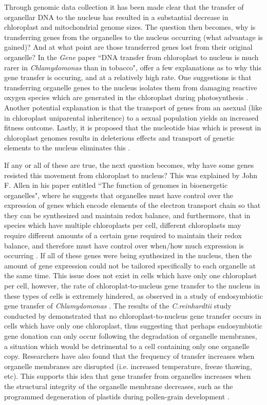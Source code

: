 \documentclass[a4paper,12pt]{article}
\begin{document}
\begin{multicols}{2}
Through genomic data collection it has been made clear that the
transfer of organellar DNA to the nucleus has resulted in a
substantial decrease in chloroplast and mitochondrial genome sizes. The
question then becomes, why is transferring genes from the organelles
to the nucleus occurring (what advantage is gained)? And at what point are those transferred
genes lost from their original organelle? In the \textit{Gene} paper
``DNA transfer from chloroplast to nucleus
is much rarer in \textit{Chlamydomonas} than in tobacco",
\citet{ListerEtAl2003}
offer a few explanations as to why this gene transfer is occuring,
and at a relatively high rate. One suggestions is that transferring
organelle genes to the nucleus isolates them from damaging reactive
oxygen species which are generated in the chloroplast during
photosynthesis \citep{ListerEtAl2003}. Another potential explanation
is that the transport of genes from an asexual (like in chloroplast
uniparental inheritence) to a
sexual
population yields an increased fitness outcome. Lastly, it is
proposed that the nucleotide bias which is present in chloroplast
genomes results in deleterious effects and transport of genetic
elements to the nucleus
eliminates this \citep{ListerEtAl2003}. 

 If any or all of these are
true, the next question becomes, why have some genes resisted this
movement from chloroplast to nucleus? This was explained by John F.
Allen in his paper entitled ``The function of genomes in bioenergetic
organelles", where he suggests that organelles must have control
over the expression of genes which encode elements of the electron
transport chain so that they can be synthesized and maintain redox
balance, and furthermore, that in species which have multiple
chloroplasts per cell, different chloroplasts may require different
amounts of a certain gene required to maintain their redox balance,
and therefore must have control over when/how much expression is
occurring \citep{Allen2003}. If all of these genes were being
synthesized in the nucleus, then the amount of gene expression could
not be tailored specifically to each organelle at the same time.
This issue does not exist in cells which have only one chloroplast
per cell, however, the rate of chloroplat-to-nucleus gene transfer to the
nucleus in these types of cells is extremely hindered, as observed
in a study of endosymbiotic gene transfer of
\textit{Chlamydomonas} \citep{ListerEtAl2003}. The results of the
\textit{C.reinhardtii} study conducted by \citet{ListerEtAl2003} demonstrated
that no chloroplast-to-nucleus gene transfer occurs in cells which
have only one chloroplast, thus suggesting that perhaps
endosymbiotic gene donation can only occur following the degradation
of organelle membranes, a situation which would be detrimental to a
cell containing only one organelle copy. Researchers
have also found that the frequency
of transfer increases when organelle membranes are 
disrupted (i.e. increased temperature, freeze thawing, etc). This
supports this idea that gene transfer from organelles increases
when the structural integrity of the organelle membrane decreases,
such as the programmed degeneration of plastids during pollen-grain
development \citep{TimmisEtAl2004}.


\end{multicols}
\end{document}
